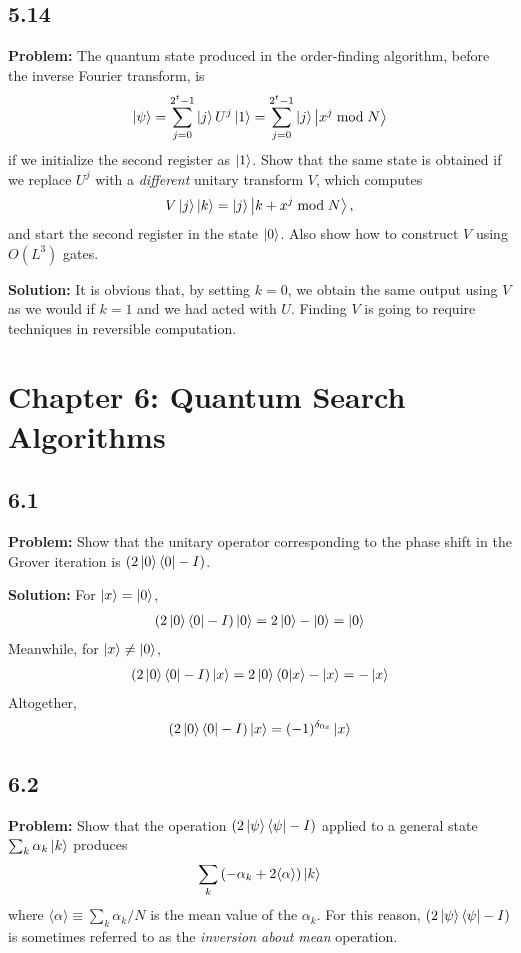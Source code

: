 \documentclass{article}
\begin{document}
\subsection*{5.14}
\textbf{Problem:} The quantum state produced in the order-finding algorithm, before
the inverse Fourier transform, is
\begin{align}
    \ket{\psi} =\sum_{j=0}^{2^t-1}\ket{j}U^j\ket{1} =\sum_{j=0}^{2^t-1}\ket{j}\ket{x^j\bmod N}
\end{align}
if we initialize the second register as $\ket{1}$. Show that the same state is obtained if we replace $U^j$ with a \emph{different} unitary transform $V$, which computes
\begin{align}
    V\ket{j}\ket{k} = \ket{j}\ket{k+x^j\bmod N},
\end{align}
and start the second register in the state $\ket{0}$. Also show how to construct $V$ using $O(L^3)$ gates.

\textbf{Solution:} It is obvious that, by setting $k=0$, we obtain the same output using $V$ as we would if $k=1$ and we had acted with $U$. Finding $V$ is going to require techniques in reversible computation. 

\section*{Chapter 6: Quantum Search Algorithms}
\subsection*{6.1} 
\textbf{Problem:} Show that the unitary operator corresponding to the phase shift in the Grover iteration is $(2\ket{0}\bra{0}-I)$.

\textbf{Solution:} For $\ket{x} = \ket{0}$,
\begin{align}
    (2\ket{0}\bra{0}-I)\ket{0} = 2\ket{0}-\ket{0} = \ket{0}
\end{align}
Meanwhile, for $\ket{x} \neq \ket{0}$,
\begin{align}
    (2\ket{0}\bra{0}-I)\ket{x} = 2\ket{0}\braket{0}{x}-\ket{x} = -\ket{x}
\end{align}
Altogether,
\begin{align}
    (2\ket{0}\bra{0}-I)\ket{x} = (-1)^{\delta_{0x}}\ket{x}
\end{align}

\subsection*{6.2}
\textbf{Problem:} Show that the operation $(2\ket{\psi}\bra{\psi}-I)$ applied to a general state $\sum_k \alpha_k \ket{k}$ produces
\begin{align}
    \sum_k \left(-\alpha_k+2\langle\alpha\rangle\right)\ket{k}
\end{align}
where $\langle\alpha\rangle \equiv \sum_k\alpha_k/N$ is the mean value of the $\alpha_k$. For this reason, $(2\ket{\psi}\bra{\psi}-I)$ is sometimes referred to as the \emph{inversion about mean} operation.
\end{document}
